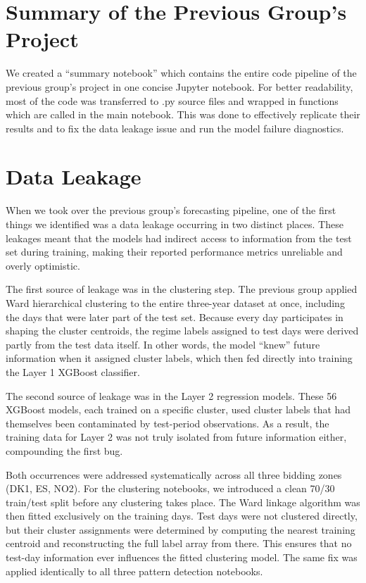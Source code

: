\documentclass[12pt, a4paper]{article}
\begin{document}
\section{Summary of the Previous Group's Project}

We created a ``summary notebook'' which contains the entire code pipeline of the
previous group's project in one concise Jupyter notebook. For better readability,
most of the code was transferred to .py source files and wrapped in functions
which are called in the main notebook. This was done to effectively replicate
their results and to fix the data leakage issue and run the model failure
diagnostics.

\section{Data Leakage}

When we took over the previous group's forecasting pipeline, one of the first
things we identified was a data leakage occurring in two distinct places. These
leakages meant that the models had indirect access to information from the test
set during training, making their reported performance metrics unreliable and
overly optimistic.

The first source of leakage was in the clustering step. The previous group applied
Ward hierarchical clustering to the entire three-year dataset at once, including
the days that were later part of the test set. Because every day participates in
shaping the cluster centroids, the regime labels assigned to test days were
derived partly from the test data itself. In other words, the model ``knew''
future information when it assigned cluster labels, which then fed directly into
training the Layer 1 XGBoost classifier.

The second source of leakage was in the Layer 2 regression models. These 56
XGBoost models, each trained on a specific cluster, used cluster labels that had
themselves been contaminated by test-period observations. As a result, the
training data for Layer 2 was not truly isolated from future information either,
compounding the first bug.

Both occurrences were addressed systematically across all three bidding zones
(DK1, ES, NO2). For the clustering notebooks, we introduced a clean 70/30
train/test split before any clustering takes place. The Ward linkage algorithm
was then fitted exclusively on the training days. Test days were not clustered
directly, but their cluster assignments were determined by computing the nearest
training centroid and reconstructing the full label array from there. This ensures
that no test-day information ever influences the fitted clustering model. The same
fix was applied identically to all three pattern detection notebooks.
\end{document}

